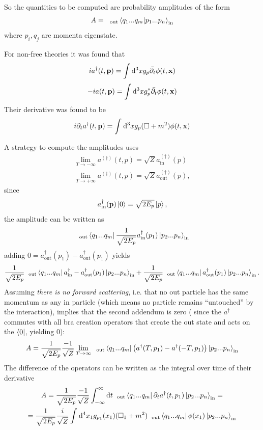 
So the quantities to be computed are probability amplitudes of the form
\[
    A=\phantom{x}_\text{out}\bra{q_1...q_m}\ket{p_1...p_n}_\text{in}
\]
where $p_i,q_j$ are momenta eigenstate.

For non-free theories it was found that
\[
    ia^\dagger(t,\mathbf{p})=\int\dd^3x g_p\bar{\partial_t} \phi(t,\mathbf{x})
\]
\[
    -ia(t,\mathbf{p})=\int\dd^3x g^*_p\bar{\partial_t} \phi(t,\mathbf{x})
\]
Their derivative was found to be
\[
    i\partial_ta^\dagger (t,\mathbf{p}) = \int_{}^{} \dd^3x g_p(\Box+m^2)\phi(t,
    \mathbf{x})
\]

A strategy to compute the amplitudes uses
\begin{gather*}
    \lim\limits_{T\to-\infty} a^{(\dagger)}(t,p) = \sqrt{Z}a_\text{in}^{(\dagger)}
    (p)\\
    \lim\limits_{T\to+\infty} a^{(\dagger)}(t,p) =\sqrt{Z}a_\text{out}^{(\dagger)}
    (p),
\end{gather*}
since
\[
    a_\text{in}^\dagger (\mathbf{p})\ket{0} = \sqrt{2E_p}\ket{p},
\]
the amplitude can be written as
\[
    \phantom{x}_\text{out}\bra{q_1...q_m}\frac{1}{\sqrt{2E_p}}a^\dagger_\text{in}
    (p_1)\ket{p_2...p_n}_\text{in}
\]
adding $0=a_\text{out}^\dagger(p_1)-a_\text{out}^\dagger(p_1)$ yields
\[
    \frac{1}{\sqrt{2E_p}}\phantom{x}_\text{out}\bra{q_1...q_m}a_\text{in}^\dagger
    -a_\text{out}^\dagger(p_1)\ket{p_2...p_n}_\text{in} +
    \frac{1}{\sqrt{2E_p}}\phantom{x}_\text{out}\bra{q_1...q_m}a^\dagger_\text{out}
    (p_1)\ket{p_2...p_n}_\text{in}.
\]
Assuming \textit{there is no forward scattering}, i.e. that no out particle has
the same momentum as any in particle (which means no particle remains
``untouched'' by the interaction), implies that the second addendum is zero (
since the $a^\dagger $ commutes with all bra creation operators that
create the out state and acts on the $\bra{0}$, yielding 0):
\[
    A = \frac{1}{\sqrt{2E_p}}\frac{-1}{\sqrt{Z}}\lim\limits_{T\to\infty}
    \phantom{x}_\text{out}
    \bra{q_1...q_m}
    \left(a^\dagger(T,p_1)-a^\dagger(-T,p_1)\right)\ket{p_2...p_n}_\text{in}
\]
The difference of the operators can be written as the integral over time of their
derivative
\begin{gather*}
    A = \frac{1}{\sqrt{2E_p}}\frac{-1}{\sqrt{Z}}\int_{-\infty}^{\infty} \dd t
    \phantom{x}_
    \text{out}\bra{q_1...q_m}\partial_ta^\dagger(t,p_1)\ket{p_2...p_n}_\text{in}=\\
    =\frac{1}{\sqrt{2E_p}}\frac{i}{\sqrt{Z}}\int_{}^{} \dd^4x_1g_{p_1}(x_1)
    (\Box_1+m^2)\phantom{x}_\text{out}\bra{q_1...q_m}\phi(x_1)\ket{p_2...p_n}_
    \text{in}
\end{gather*}
